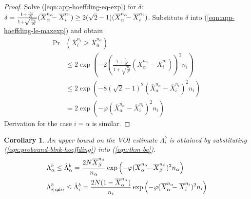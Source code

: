 \documentclass[]{article}
\newtheorem{crl}{Corollary}
\begin{document}
\begin{proof}
Solve (\ref{eqn:app-hoeffding-eq-exp}) for $\delta$: $\delta=\frac {1+\frac {n_i} N} {1+\sqrt {\frac {n_i} N}} (\overline X_\alpha^{n_\alpha}\hspace{-0.5em}
- \overline X_i^{n_i}) \ge 2(\sqrt 2 - 1)(\overline X_\alpha^{n_\alpha}\hspace{-0.5em}-\overline X_i^{n_i})$. Substitute $\delta$ into 
(\ref{eqn:app-hoeffding-le-maxexp}) and obtain
\begin{align}
\Pr&(\overline X_i^{n_i}\ge \overline X_\alpha^{n_\alpha}) \nonumber\\
& \le 2\exp\left(-2\left( \frac {1+\frac {n_i} N} {1+\sqrt {\frac {n_i} N}}
                          (\overline X_\alpha^{n_\alpha} - \overline X_i^{n_i})\right)^2 n_i\right)\nonumber \\
& \le 2\exp(-8(\sqrt 2 - 1)^2(\overline X_\alpha^{n_\alpha} - \overline X_i^{n_i})^2n_i)\nonumber\\
& = 2\exp(-\varphi(\overline X_\alpha^{n_\alpha} - \overline X_i^{n_i})^2n_i)
\end{align}
Derivation for the case $i=\alpha$ is similar.
\end{proof}

\begin{crl}
An upper bound on the VOI estimate $\Lambda_i^b$ is obtained
by substituting (\ref{eqn:probound-blnk-hoeffding}) into (\ref{eqn:thm-be}).
\begin{align}
  \label{eqn:bound-blnk-hoeffding}
  \Lambda&_\alpha^b \le \hat\Lambda_\alpha^b=\frac {2N\overline X_\beta^{n_\beta}} {n_\alpha}\exp\left(- \varphi(\overline X_\alpha^{n_\alpha}\hspace{-0.5em} - \overline X_\beta^{n_\beta})^2 n_\alpha\right)\nonumber\\
  \Lambda&_{i|i\ne\alpha}^b\le \hat\Lambda_i^b=  \frac {2N(1-\overline  X_\alpha^{n_\alpha})} {n_i}\exp\left(- \varphi(\overline X_\alpha^{n_\alpha}\hspace{-0.5em} - \overline X_i^{n_i})^2 n_i\right)
\end{align}
\label{crl:bound-blnk-hoeffding}
\end{crl}
\vspace{-2em}
\end{document}
